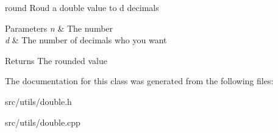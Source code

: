 round Roud a double value to d decimals 


\begin{DoxyParams}{Parameters}
{\em n} & The number \\
\hline
{\em d} & The number of decimals who you want \\
\hline
\end{DoxyParams}
\begin{DoxyReturn}{Returns}
The rounded value 
\end{DoxyReturn}


The documentation for this class was generated from the following files\+:\begin{DoxyCompactItemize}
\item 
src/utils/double.\+h\item 
src/utils/double.\+cpp\end{DoxyCompactItemize}

